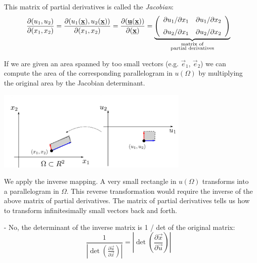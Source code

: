 This matrix of partial derivatives is called the \emph{Jacobian}:
$$
\frac{\partial (u_1, u_2)}{\partial (x_1,x_2)} = 
\frac{\partial (u_1(\vec x), u_2(\vec x))}{\partial (x_1,x_2)} = 
\frac{\partial (\vec u(\vec x))}{\partial (\vec x)} =
\underbrace{
\rmat{
{\partial u_1}/{\partial x_1} & {\partial u_1}/{\partial x_2}\\[0.2cm]
{\partial u_2}/{\partial x_1} & {\partial u_2}/{\partial x_2}
}%
}_{
\substack{
\text{matrix of}\\
\text{partial derivatives}
}%
}
$$

If we are given an area spanned by too small vectors (e.g. $\vec e_1$, $\vec e_2$) 
we can compute the area of the corresponding parallelogram in $u(\Omega)$ 
by multiplying the original area by the Jacobian determinant.


\includegraphics[width=0.7\textwidth]{img/reverse.pdf}

We apply the inverse mapping. A very small rectangle in $u(\Omega)$ transforms into a parallelogram in $\Omega$. 
This reverse transformation would require the inverse of the above matrix of partial derivatives.
The matrix of partial derivatives tells us how to transform infinitesimally small vectors back and forth.




- No, the determinant of the inverse matrix is 1 / det of the original matrix:
$$
\frac{1}{\left| \det \left( \frac{\partial \vec u}{\partial \vec x} \right) \right|} =
{\left| \det \left( \frac{\partial \vec x}{\partial \vec u} \right) \right|}
$$

